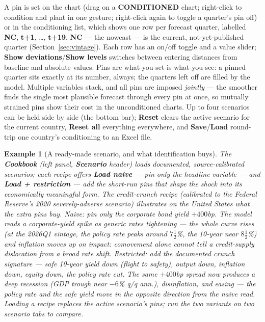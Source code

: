 \documentclass[11pt]{article}
\newcommand{\ui}[1]{\textbf{#1}}
\theoremstyle{plain}
\newtheorem{example}{Example}
\theoremstyle{remark}
\begin{document}
A pin is set on the chart (drag on a \ui{CONDITIONED} chart;
right-click to condition and plant in one gesture; right-click again to
toggle a quarter's pin off) or in the conditioning list, which shows one
row per forecast quarter, labelled \ui{NC}, \ui{t+1}, \dots, \ui{t+19}.
\ui{NC} --- the nowcast --- is the current, not-yet-published quarter
(Section~\ref{sec:vintage}). Each row has an on/off toggle and a value
slider; \ui{Show deviations}/\ui{Show levels} switches between entering
distances from baseline and absolute values. Pins are
what-you-set-is-what-you-see: a pinned quarter sits exactly at its
number, always; the quarters left off are filled by the model. Multiple
variables stack, and all pins are imposed \emph{jointly} --- the
smoother finds the single most plausible forecast through every pin at
once, so mutually strained pins show their cost in the unconditioned
charts. Up to four scenarios can be held side by side (the bottom bar);
\ui{Reset} clears the active scenario for the current country,
\ui{Reset all} everything everywhere, and \ui{Save}/\ui{Load} round-trip
one country's conditioning to an Excel file.

\begin{example}[A ready-made scenario, and what identification buys]\label{ex:cookbook}
The \ui{Cookbook} (left panel, \ui{Scenario} header) loads documented,
source-calibrated scenarios; each recipe offers \ui{Load naive} ---
pin only the headline variable --- and \ui{Load + restriction} --- add
the short-run pins that shape the shock into its economically meaningful
form. The credit-crunch recipe (calibrated to the Federal Reserve's 2020
severely-adverse scenario) illustrates on the United States what the
extra pins buy. \emph{Naive}: pin only the corporate bond yield $+400$bp.
The model reads a corporate-yield spike as generic rates tightening ---
the whole curve rises (at the 2026Q1 vintage, the policy rate peaks
around $7\tfrac12$\%, the 10-year near $8\tfrac12$\%) and inflation
moves \emph{up} on impact: comovement alone cannot tell a credit-supply
dislocation from a broad rate shift. \emph{Restricted}: add the
documented crunch signature --- safe 10-year yield \emph{down}
(flight to safety), output down, inflation down, equity down, the policy
rate cut. The same $+400$bp spread now produces a deep recession
(GDP trough near $-6$\% q/q ann.), disinflation, and easing --- the
policy rate and the safe yield move in the \emph{opposite} direction
from the naive read. Loading a recipe \emph{replaces} the active
scenario's pins; run the two variants on two scenario tabs to compare.
\end{example}
\end{document}
